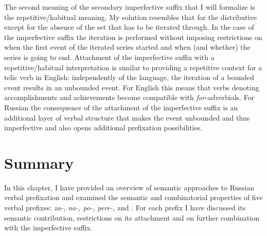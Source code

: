
The second meaning of the secondary imperfective suffix that I will formalize is the repetitive/habitual meaning. My solution resembles that for the distributive  except for the absence of the set that has to be iterated through. In the case of the imperfective suffix the iteration is performed without imposing restrictions on when the first event of the iterated series started and when (and whether) the series is going to end. Attachment of the imperfective suffix with a repetitive/habitual interpretation is similar to providing a repetitive context for a telic verb in English: independently of the language, the iteration of a bounded event results in an unbounded event. For English this means that verbs denoting accomplishments and achievements become compatible with \textit{for}-adverbials. For Russian the consequence of the attachment of the imperfective suffix is an additional layer of verbal structure that makes the event unbounded and thus imperfective and also opens additional prefixation possibilities. 


\section{Summary}
In this chapter, I have provided an overview of semantic approaches to Russian verbal prefixation and examined the semantic and combinatorial properties of five verbal prefixes: \textit{za-, na-, po-, pere-,} and . For each prefix I have discussed its semantic contribution, restrictions on its attachment and on further combination with the imperfective suffix. 

